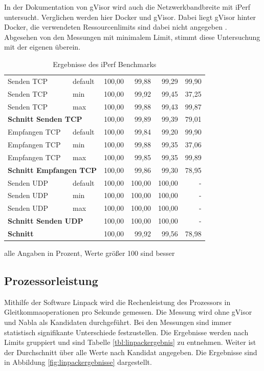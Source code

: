 In der Dokumentation von gVisor wird auch die Netzwerkbandbreite mit iPerf untersucht. Verglichen werden hier Docker und gVisor. Dabei liegt gVisor hinter Docker, die verwendeten Ressourcenlimits sind dabei nicht angegeben \cite[vgl.][]{gVisor.20200122b}. Abgesehen von den Messungen mit minimalem Limit, stimmt diese Untersuchung mit der eigenen überein.

\begin{table}[h]
	\myfloatalign
	\small 
	\begin{tabularx}{\textwidth}{Xlrrrr} \hline
		\spacedlowsmallcaps{Messung} & \spacedlowsmallcaps{Limit} & \spacedlowsmallcaps{Docker} & \spacedlowsmallcaps{Kata} & \spacedlowsmallcaps{Kata FC} & \spacedlowsmallcaps{gVisor} \\ \hline
		Senden TCP & default & 100,00 & 99,88 & 99,29 & 99,90 \\
		Senden TCP & min & 100,00 & 99,92 & 99,45 & 37,25 \\
		Senden TCP & max & 100,00 & 99,88 & 99,43 & 99,87 \\ \hline
		\multicolumn{2}{l}{\textbf{Schnitt Senden TCP}} & 100,00 & 99,89 & 99,39 & 79,01 \\ \hline
		Empfangen TCP & default & 100,00 & 99,84 & 99,20 & 99,90 \\
		Empfangen TCP & min & 100,00 & 99,88 & 99,35 & 37,06 \\
		Empfangen TCP & max & 100,00 & 99,85 & 99,35 & 99,89 \\ \hline
		\multicolumn{2}{l}{\textbf{Schnitt Empfangen TCP}} & 100,00 & 99,86 & 99,30 & 78,95 \\ \hline
		Senden UDP & default & 100,00 & 100,00 & 100,00 & - \\
		Senden UDP & min & 100,00 & 100,00 & 100,00 & - \\
		Senden UDP & max & 100,00 & 100,00 & 100,00 & - \\ \hline
		\multicolumn{2}{l}{\textbf{Schnitt Senden UDP}} & 100,00 & 100,00 & 100,00 & - \\ \hline
		\textbf{\textbf{Schnitt}} & & 100,00 & 99,92 & 99,56 & 78,98 \\ 	\hline
	\end{tabularx}
	\caption[Ergebnisse des iPerf Benchmarks]{Ergebnisse des iPerf Benchmarks}
	\footnotesize alle Angaben in Prozent, Werte größer 100 sind besser
	\label{tbl:iperfergebnis}
\end{table}

\subsection{Prozessorleistung}
Mithilfe der Software Linpack wird die Rechenleistung des Prozessors in Gleitkommaoperationen pro Sekunde gemessen. Die Messung wird ohne gVisor und Nabla als Kandidaten durchgeführt. Bei den Messungen sind immer statistisch signifikante Unterschiede festzustellen. Die Ergebnisse werden nach Limits gruppiert und sind Tabelle \ref{tbl:linpackergebnis} zu entnehmen. Weiter ist der Durchschnitt über alle Werte nach Kandidat angegeben. Die Ergebnisse sind in Abbildung \ref{fig:linpackergebnisse} dargestellt.

